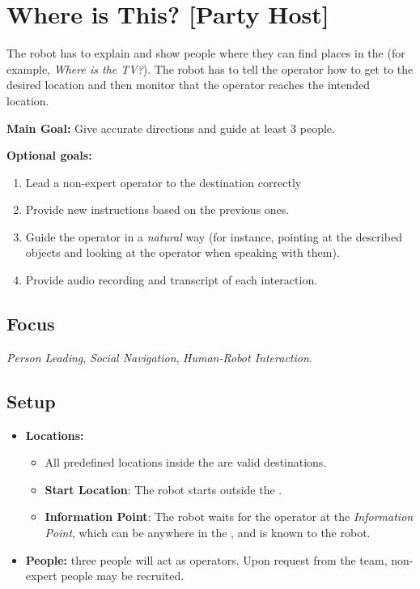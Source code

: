 \section{Where is This? [Party Host]}
\label{test:where-is-this}
The robot has to explain and show people where they can find places in the \Arena{} (for example, \emph{Where is the TV?}). The robot has to tell the operator how to get to the desired location and then monitor that the operator reaches the intended location.

\noindent \textbf{Main Goal:} Give accurate directions and guide at least 3 people.

\noindent \textbf{Optional goals:}
\begin{enumerate}[nosep]
	\item Lead a non-expert operator to the destination correctly
	\item Provide new instructions based on the previous ones.
	\item Guide the operator in a \emph{natural} way (for instance, pointing at the described objects and looking at the operator when speaking with them).
	\item Provide audio recording and transcript of each interaction.
\end{enumerate}


\subsection*{Focus}
\emph{Person Leading}, \emph{Social Navigation}, \emph{Human-Robot Interaction}.


\subsection*{Setup}
\begin{itemize}[nosep]
	\item \textbf{Locations:} 
	\begin{itemize}
	 \item All predefined locations inside the \Arena{} are valid destinations.
	 \item \textbf{Start Location}:  The robot starts outside the \Arena{}. 
	 \item \textbf{Information Point}: The robot waits for the operator at the \emph{Information Point}, which can be anywhere in the \Arena{}, and is known to the robot. 
	\end{itemize}
		\item \textbf{People:} three people will act as operators. Upon request from the team, non-expert people may be recruited.
\end{itemize}


